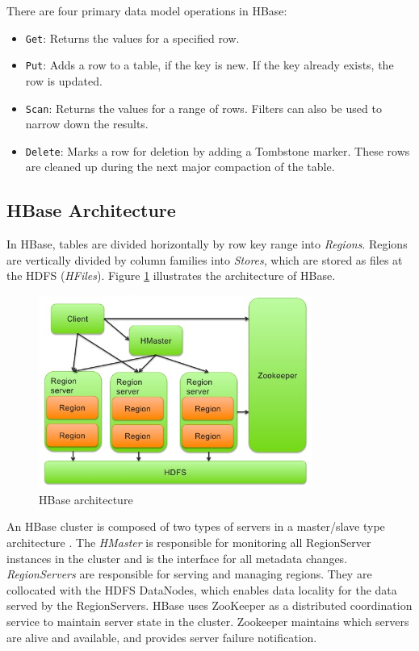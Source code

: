 There are four primary data model operations in HBase:
\begin{itemize}
\item \texttt{Get}: Returns the values for a specified row.
\item \texttt{Put}: Adds a row to a table, if the key is new. If the key already exists, the row is updated.
\item \texttt{Scan}: Returns the values for a range of rows. Filters can also be used to narrow down the results.
\item \texttt{Delete}: Marks a row for deletion by adding a Tombstone marker. These rows are cleaned up during the next major compaction of the table.
\end{itemize}

\subsection{HBase Architecture}

In HBase, tables are divided horizontally by row key range into \emph{Regions}. Regions are vertically divided by column families into \emph{Stores}, which are stored as files at the HDFS (\emph{HFiles}). Figure \ref{figure:hbase_architecture} illustrates the architecture of HBase.

\begin{figure}[h!]
\centering
\includegraphics[width=0.8\textwidth]{figures/hbase_architecture}
\caption{HBase architecture}
\label{figure:hbase_architecture}
\end{figure}

An HBase cluster is composed of two types of servers in a master/slave type architecture \cite{mapr_hbase_architecture}. The \emph{HMaster} is responsible for monitoring all RegionServer instances in the cluster and is the interface for all metadata changes. \emph{RegionServers} are responsible for serving and managing regions. They are collocated with the HDFS DataNodes, which enables data locality for the data served by the RegionServers. HBase uses ZooKeeper as a distributed coordination service to maintain server state in the cluster. Zookeeper maintains which servers are alive and available, and provides server failure notification.

